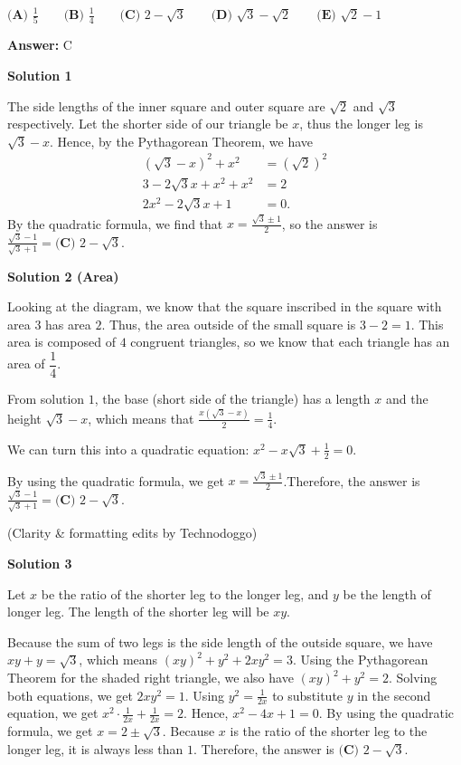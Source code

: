 \begin{enumerate}
$\textbf{(A) }\frac15\qquad\textbf{(B) }\frac14\qquad\textbf{(C) }2-\sqrt3\qquad\textbf{(D) }\sqrt3-\sqrt2\qquad\textbf{(E) }\sqrt2-1$

 \textbf{Answer: }C



\textbf{Solution 1}

The side lengths of the inner square and outer square are $\sqrt{2}$ and $\sqrt{3}$ respectively. Let the shorter side of our triangle be $x$, thus the longer leg is $\sqrt{3}-x$. Hence, by the Pythagorean Theorem, we have 
 \begin{align*} (\sqrt{3}-x)^2+x^2&=(\sqrt{2})^2 \\ 3-2\sqrt{3}x+x^2+x^2&=2 \\ 2x^2-2\sqrt{3}x+1&=0. \end{align*}
By the quadratic formula, we find that $x=\frac{\sqrt{3}\pm1}{2}$, so the answer is $\frac{\sqrt{3}-1}{\sqrt{3}+1}=\boxed{\textbf{(C) }2-\sqrt3}.$




\textbf{Solution 2 (Area)}

Looking at the diagram, we know that the square inscribed in the square with area $3$ has area $2$. Thus, the area outside of the small square is $3-2=1.$ This area is composed of $4$ congruent triangles, so we know that each triangle has an area of $\dfrac14$. 

 From solution $1$, the base (short side of the triangle) has a length $x$ and the height $\sqrt{3} - x$, which means that $\frac{x\left(\sqrt{3} - x\right)}{2} = \frac{1}{4}$. 

 We can turn this into a quadratic equation: $x^2-x\sqrt{3}+\frac{1}{2} = 0$. 

 By using the quadratic formula, we get $x=\frac{\sqrt{3}\pm1}{2}$.Therefore, the answer is $\frac{\sqrt{3}-1}{\sqrt{3}+1}=\boxed{\textbf{(C) }2-\sqrt3}.$

 (Clarity & formatting edits by Technodoggo)

 



\textbf{Solution 3}

Let $x$ be the ratio of the shorter leg to the longer leg, and $y$ be the length of longer leg. The length of the shorter leg will be $xy$.

 Because the sum of two legs is the side length of the outside square, we have $xy + y = \sqrt{3}$, which means $(xy)^2 + y^2 + 2xy^2 = 3$. Using the Pythagorean Theorem for the shaded right triangle, we also have $(xy)^2 + y^2 = 2$. Solving both equations, we get $2xy^2 = 1$. Using $y^2=\frac{1}{2x}$ to substitute $y$ in the second equation, we get $x^2\cdot \frac{1}{2x} + \frac{1}{2x} = 2$. Hence, $x^2 - 4x + 1 = 0$. By using the quadratic formula, we get $x=2\pm \sqrt3$. Because $x$ is the ratio of the shorter leg to the longer leg, it is always less than $1$. Therefore, the answer is $\boxed{\textbf{(C) }2-\sqrt3}$.


\end{enumerate}
